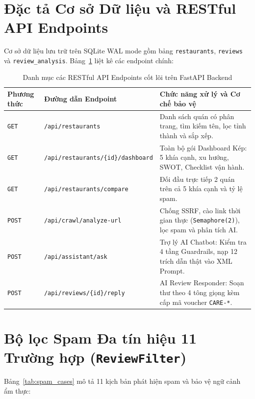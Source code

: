 \section{Đặc tả Cơ sở Dữ liệu và RESTful API Endpoints}
Cơ sở dữ liệu lưu trữ trên SQLite WAL mode gồm bảng \texttt{restaurants}, \texttt{reviews} và \texttt{review\_analysis}. Bảng~\ref{tab:api_endpoints} liệt kê các endpoint chính:

\begin{table}[H]
\centering
\caption{Danh mục các RESTful API Endpoints cốt lõi trên FastAPI Backend}
\label{tab:api_endpoints}
\vspace{0.15cm}
\footnotesize
\begin{tabularx}{\textwidth}{l l X}
\toprule
\rowcolor{blue!8}
\textbf{Phương thức} & \textbf{Đường dẫn Endpoint} & \textbf{Chức năng xử lý và Cơ chế bảo vệ} \\
\midrule
\texttt{GET} & \texttt{/api/restaurants} & Danh sách quán có phân trang, tìm kiếm tên, lọc tỉnh thành và sắp xếp. \\
\texttt{GET} & \texttt{/api/restaurants/\{id\}/dashboard} & Toàn bộ gói Dashboard Kép: 5 khía cạnh, xu hướng, SWOT, Checklist vận hành. \\
\texttt{GET} & \texttt{/api/restaurants/compare} & Đối đầu trực tiếp 2 quán trên cả 5 khía cạnh và tỷ lệ spam. \\
\texttt{POST} & \texttt{/api/crawl/analyze-url} & Chống SSRF, cào link thời gian thực (\texttt{Semaphore(2)}), lọc spam và phân tích AI. \\
\texttt{POST} & \texttt{/api/assistant/ask} & Trợ lý AI Chatbot: Kiểm tra 4 tầng Guardrails, nạp 12 trích dẫn thật vào XML Prompt. \\
\texttt{POST} & \texttt{/api/reviews/\{id\}/reply} & AI Review Responder: Soạn thư theo 4 tông giọng kèm cấp mã voucher \texttt{CARE-*}. \\
\bottomrule
\end{tabularx}
\end{table}

\section{Bộ lọc Spam Đa tín hiệu 11 Trường hợp (\texttt{ReviewFilter})}
Bảng~\ref{tab:spam_cases} mô tả 11 kịch bản phát hiện spam và bảo vệ ngữ cảnh ẩm thực:

